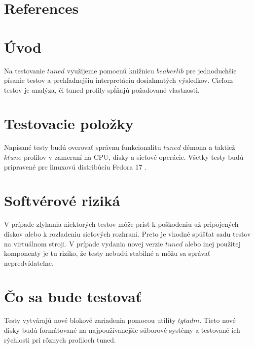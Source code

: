 \section{References}

\section{Úvod}
Na testovanie $tuned$ využijeme pomocnú knižnicu $beakerlib$
\cite{beakerlibHomepage} pre jednoduchšie písanie testov a prehľadnejšiu
interpretáciu dosiahnutých výsledkov. Cieľom testov je analýza, či tuned
profily spĺňajú požadované vlastnosti.

\section{Testovacie položky}
Napísané testy budú overovať správnu funkcionalitu $tuned$ démona a taktiež
$ktune$ profilov v zameraní na CPU, disky a sieťové operácie. Všetky testy budú
pripravené pre linuxovú distribúciu Fedora 17 \cite{fedoraHomepage}.

\section{Softvérové riziká}
V prípade zlyhania niektorých testov môže prísť k poškodeniu už pripojených
diskov alebo k rozladeniu sieťových rozhraní. Preto je vhodné spúšťat sadu
testov na virtuálnom stroji. V prípade vydania novej verzie $tuned$ alebo inej
použitej komponenty je tu riziko, že testy nebudú stabilné a môžu sa správať
nepredvídateľne.

\section{Čo sa bude testovať}
Testy vytvárajú nové blokové zariadenia pomocou utility $tgtadm$. Tieto nové
disky budú formátované na najpoužívanejšie súborové systémy a testované ich
rýchlosti pri rôznych profiloch tuned.

